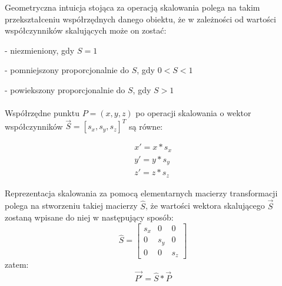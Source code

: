 \documentclass[licencjacka]{pracamgr}
\begin{document}
Geometryczna intuicja stojąca za operacją skalowania polega na takim przekształceniu współrzędnych danego obiektu, że w zależności od wartości współczynników skalujących może on zostać: 

- niezmieniony, gdy $S=1$

- pomniejszony proporcjonalnie do $S$, gdy $0<S<1$

- powiekszony proporcjonalnie do $S$, gdy $S>1$
\\
\\
Współrzędne punktu $P=(x,y,z)$ po operacji skalowania o wektor współczynników $\vec{S}=[s_x,s_y,s_z]^T$ są równe:

$$
\begin{array}{lr}
x'=x*s_x \\
y'=y*s_y \\
z'=z*s_z
\end{array}
$$

Reprezentacja skalowania za pomocą elementarnych macierzy transformacji polega na stworzeniu takiej macierzy $\hat{S}$, że wartości wektora skalującego $\vec{S}$ zostaną wpisane do niej w następujący sposób:
$$
\hat{S}
=
\begin{bmatrix}
s_x & 0 & 0 \\
0 & s_y & 0 \\
0 & 0 & s_z
\end{bmatrix}
$$
zatem:
$$
\vec{P'}=\hat{S}*\vec{P}
$$
\end{document}
